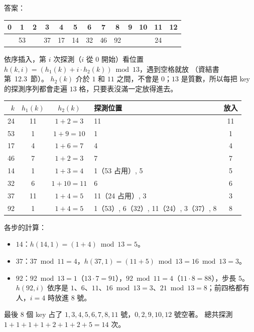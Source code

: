 \begin{pastsoln}
答案：
\begin{center}
\begin{tabular}{|*{13}{c|}}
\hline
0 & 1 & 2 & 3 & 4 & 5 & 6 & 7 & 8 & 9 & 10 & 11 & 12 \\ \hline
 & 53 & & 37 & 17 & 14 & 32 & 46 & 92 & & & 24 & \\ \hline
\end{tabular}
\end{center}

依序插入，第 $i$ 次探測（$i$ 從 $0$ 開始）看位置 $h(k, i) = (h_1(k) + i \cdot h_2(k)) \bmod 13$，遇到空格就放
（資結書第~12.3~節）。 $h_2(k)$ 介於 $1$ 和 $11$ 之間，不會是 $0$；$13$ 是質數，所以每把 key 的探測序列都會走遍
$13$ 格，只要表沒滿一定放得進去。
\begin{center}
\small
\begin{tabular}{rcclc}
\toprule
$k$ & $h_1(k)$ & $h_2(k)$ & 探測位置 & 放入 \\
\midrule
24 & 11 & $1 + 2 = 3$ & 11 & 11 \\
53 & 1 & $1 + 9 = 10$ & 1 & 1 \\
17 & 4 & $1 + 6 = 7$ & 4 & 4 \\
46 & 7 & $1 + 2 = 3$ & 7 & 7 \\
14 & 1 & $1 + 3 = 4$ & 1（53 占用）, 5 & 5 \\
32 & 6 & $1 + 10 = 11$ & 6 & 6 \\
37 & 11 & $1 + 4 = 5$ & 11（24 占用）, 3 & 3 \\
92 & 1 & $1 + 4 = 5$ & 1（53）, 6（32）, 11（24）, 3（37）, 8 & 8 \\
\bottomrule
\end{tabular}
\end{center}
各步的計算：
\begin{itemize}
\item $14$：$h(14, 1) = (1 + 4) \bmod 13 = 5$。
\item $37$：$37 \bmod 11 = 4$，$h(37, 1) = (11 + 5) \bmod 13 = 16 \bmod 13 = 3$。
\item $92$：$92 \bmod 13 = 1$（$13 \cdot 7 = 91$），$92 \bmod 11 = 4$（$11 \cdot 8 = 88$），步長 $5$。
$h(92, i)$ 依序是 $1$、$6$、$11$、$16 \bmod 13 = 3$、$21 \bmod 13 = 8$；前四格都有人，$i = 4$ 時放進 $8$ 號。
\end{itemize}
最後 $8$ 個 key 占了 $1, 3, 4, 5, 6, 7, 8, 11$ 號，$0, 2, 9, 10, 12$ 號空著。 總共探測
$1 + 1 + 1 + 1 + 2 + 1 + 2 + 5 = 14$ 次。
\end{pastsoln}
